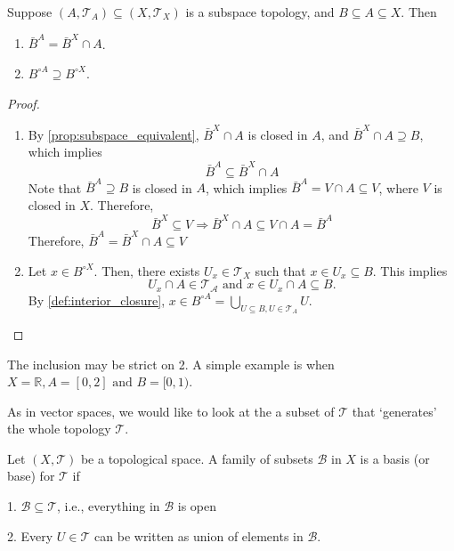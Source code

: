 \begin{proposition} 
Suppose \(\left({A,{\mathcal{T}}_{A}}\right)  \subseteq  \left({X,{\mathcal{T}}_X}\right)\) is a subspace topology, and \(B \subseteq  A \subseteq  X\). Then
\begin{enumerate}
 \item \({\bar{B}}^{A} = {\bar{B}}^X \cap  A\).
\item \({B}^{\circ A} \supseteq  {B}^{\circ X}\).
\end{enumerate}
\end{proposition}
\begin{proof} 
\leavevmode
\begin{enumerate}
    \item By \autoref{prop:subspace_equivalent}, \({\bar{B}}^X \cap  A\) is closed in \(A\), and \({\bar{B}}^X \cap  A \supseteq  B\), which implies
    \[
    {\bar{B}}^{A} \subseteq  {\bar{B}}^X\cap A
    \]
    Note that \({\bar{B}}^{A} \supseteq  B\) is closed in \(A\), which implies \({\bar{B}}^{A} = V \cap  A \subseteq  V\), where \(V\) is closed in \(X\). Therefore,
    \[
    {\bar{B}}^X \subseteq  V \Rightarrow  {\bar{B}}^X \cap  A \subseteq  V \cap  A = {\bar{B}}^{A}
    \]
    Therefore, \({\bar{B}}^{A} = {\bar{B}}^X \cap A \subseteq  V\)
    \item Let \( x \in {B}^{\circ X}\). Then, there exists \( U_x \in \mathcal{T}_{X} \) such that \(x \in U_x \subseteq B\). This implies
    \[
    U_x \cap A \in \mathcal{T_A} \text{ and } x \in U_x \cap A \subseteq B.
    \]
    By \autoref{def:interior_closure}, \(x \in {B}^{\circ A} = \mathop{\bigcup}\limits_{U \subseteq  B ,  U \in \mathcal{T}_A}U\).
\end{enumerate}
\end{proof}
\begin{remark}
    The inclusion may be strict on 2. A simple example is when \(X = \mathbb{R}, A = [0,2] \text{ and } B = [0,1) \).
\end{remark}

As in vector spaces, we would like to look at the a subset of $\mathcal{T}$ that `generates' the whole topology $\mathcal{T}$.
\begin{definition}[Basis] \label{def:base}
Let $(X, \mathcal{T})$ be a topological space. A family of subsets \(\mathcal{B}\) in \(X\) is a basis (or base) for \(\mathcal{T}\) if

1. \(\mathcal{B} \subseteq  \mathcal{T}\), i.e., everything in \(\mathcal{B}\) is open

2. Every \(U \in  \mathcal{T}\) can be written as union of elements in \(\mathcal{B}\).
\end{definition}


